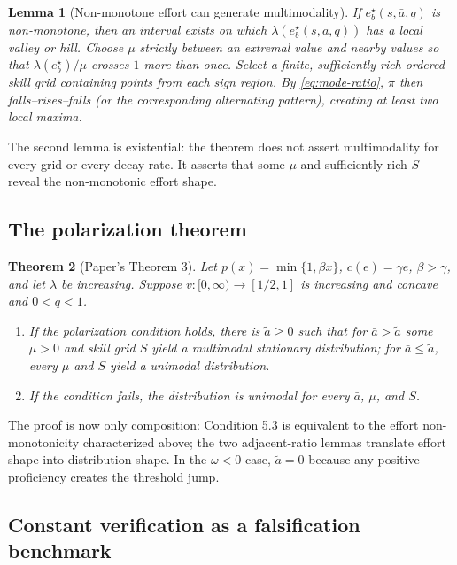 \documentclass[11pt]{article}
\theoremstyle{tutorial}
\newtheorem{theorem}{Theorem}[section]
\newtheorem{lemma}[theorem]{Lemma}
\theoremstyle{remark}
\newcommand{\1}{\mathbb{I}}
\begin{document}
\begin{lemma}[Non-monotone effort can generate multimodality]
If $e_b^\star(s,\bar a,q)$ is non-monotone, then an interval exists on which
$\lambda(e_b^\star(s,\bar a,q))$ has a local valley or hill.  Choose $\mu$ strictly between an extremal value
and nearby values so that $\lambda(e_b^\star)/\mu$ crosses $1$ more than once.  Select a finite, sufficiently
rich ordered skill grid containing points from each sign region.  By \eqref{eq:mode-ratio}, $\pi$ then
falls--rises--falls (or the corresponding alternating pattern), creating at least two local maxima.
\end{lemma}

The second lemma is existential: the theorem does not assert multimodality for every grid or every decay
rate.  It asserts that some $\mu$ and sufficiently rich $S$ reveal the non-monotonic effort shape.

\subsection{The polarization theorem}

\begin{theorem}[Paper's Theorem 3]
Let $p(x)=\min\{1,\beta x\}$, $c(e)=\gamma e$, $\beta>\gamma$, and let $\lambda$ be increasing.  Suppose
$v:[0,\infty)\to[1/2,1]$ is increasing and concave and $0<q<1$.
\begin{enumerate}
  \item If the polarization condition holds, there is $\tilde a\ge0$ such that for $\bar a>\tilde a$ some
  $\mu>0$ and skill grid $S$ yield a multimodal stationary distribution; for $\bar a\le\tilde a$, every
  $\mu$ and $S$ yield a unimodal distribution.
  \item If the condition fails, the distribution is unimodal for every $\bar a$, $\mu$, and $S$.
\end{enumerate}
\end{theorem}

The proof is now only composition: Condition 5.3 is equivalent to the effort non-monotonicity characterized
above; the two adjacent-ratio lemmas translate effort shape into distribution shape.  In the
$\omega<0$ case, $\tilde a=0$ because any positive proficiency creates the threshold jump.

\subsection{Constant verification as a falsification benchmark}
\end{document}

